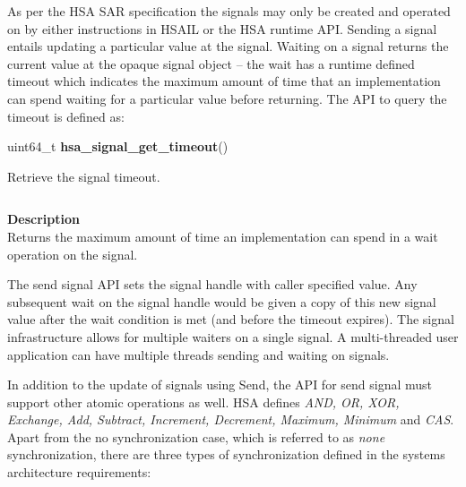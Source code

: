 \documentclass{book}
\newcommand{\hsadef}[2]{\hypertarget{#1}{\textbf{#2}}}
\newcommand{\hsatyp}[2]{\hypertarget{#1}{#2}}
\begin{document}
 
\vspace{3mm}As per the HSA SAR specification the signals may only be
created and operated on by either instructions in HSAIL or the HSA
runtime API.  Sending a signal entails updating a particular value at
the signal.  Waiting on a signal returns the current value at the
opaque signal object -- the wait has a runtime defined timeout which
indicates the maximum amount of time that an implementation can spend
waiting for a particular value before returning. The API to query the
timeout is defined as:

\makeatletter{}

\noindent\begin{tcolorbox}[nobeforeafter,colframe=white,colback=lightgray,left=0mm]
uint64\_t \hsadef{group__API__signal__timeout_1gac38679714c2c872fab1976efe1e3c021}{hsa\_signal\_get\_timeout}()

\end{tcolorbox}
Retrieve the signal timeout.

\noindent\begin{longtable}{@{}>{\hangindent=2em}p{\textwidth}}

\end{longtable}
\vspace{-5mm}\noindent\textbf{Returns}\\[1mm]
Signal timeout. The returned value is in the units of the system-wide clock whose frequency is available in \hsatyp{group__STR__platform_1gac15087b44d735fd1479fc754de556a00}{hsa\_platform\_t}.

\noindent\begin{longtable}{@{}>{\hangindent=2em}p{\linewidth}}

\end{longtable}
\vspace{-5mm}\noindent\textbf{Description}\\
Returns the maximum amount of time an implementation can spend in a wait operation on the signal. 
 

The send signal API sets the signal handle with caller specified
value. Any subsequent wait on the signal handle would be given
a copy of this new signal value after the wait condition
is met (and before the timeout expires).  The signal infrastructure
allows for multiple waiters on a single signal. A multi-threaded
user application can have multiple threads sending and waiting on
signals.

In addition to the update of signals using
Send, the API for send signal must support other atomic operations as
well. HSA defines \emph {AND, OR, XOR, Exchange, Add, Subtract,
Increment, Decrement, Maximum, Minimum} and \emph{CAS}. Apart from
the no synchronization case, which is referred to as \emph{none}
synchronization, there are three types of synchronization defined in
the systems architecture requirements:
\end{document}
